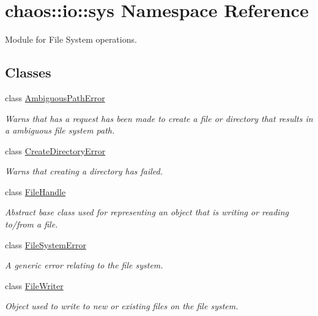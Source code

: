 \hypertarget{namespacechaos_1_1io_1_1sys}{}\section{chaos\+:\+:io\+:\+:sys Namespace Reference}
\label{namespacechaos_1_1io_1_1sys}


Module for File System operations.  


\subsection*{Classes}
\begin{DoxyCompactItemize}
\item 
class \hyperlink{classchaos_1_1io_1_1sys_1_1_ambiguous_path_error}{Ambiguous\+Path\+Error}
\begin{DoxyCompactList}\small\item\em Warns that has a request has been made to create a file or directory that results in a ambiguous file system path. \end{DoxyCompactList}\item 
class \hyperlink{classchaos_1_1io_1_1sys_1_1_create_directory_error}{Create\+Directory\+Error}
\begin{DoxyCompactList}\small\item\em Warns that creating a directory has failed. \end{DoxyCompactList}\item 
class \hyperlink{classchaos_1_1io_1_1sys_1_1_file_handle}{File\+Handle}
\begin{DoxyCompactList}\small\item\em Abstract base class used for representing an object that is writing or reading to/from a file. \end{DoxyCompactList}\item 
class \hyperlink{classchaos_1_1io_1_1sys_1_1_file_system_error}{File\+System\+Error}
\begin{DoxyCompactList}\small\item\em A generic error relating to the file system. \end{DoxyCompactList}\item 
class \hyperlink{classchaos_1_1io_1_1sys_1_1_file_writer}{File\+Writer}
\begin{DoxyCompactList}\small\item\em Object used to write to new or existing files on the file system. \end{DoxyCompactList}\item 

\end{DoxyCompactItemize}
